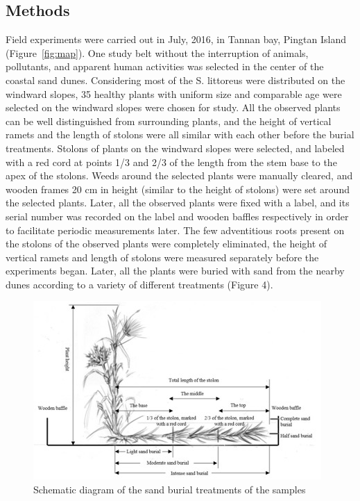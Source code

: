 \documentclass[]{interact}
\theoremstyle{plain}%
\theoremstyle{definition}
\theoremstyle{remark}
\begin{document}
\subsection{Methods}
Field experiments were carried out in July, 2016, in Tannan bay, Pingtan Island (Figure~\ref{fig:map}). One study belt without the interruption of animals, pollutants, and apparent human activities was selected in the center of the coastal sand dunes. Considering most of the S. littoreus were distributed on the windward slopes, 35 healthy plants with uniform size and comparable age were selected on the windward slopes were chosen for study. All the observed plants can be well distinguished from surrounding plants, and the height of vertical ramets and the length of stolons were all similar with each other before the burial treatments. Stolons of plants on the windward slopes were selected, and labeled with a red cord at points 1/3 and 2/3 of the length from the stem base to the apex of the stolons. Weeds around the selected plants were manually cleared, and wooden frames 20 cm in height (similar to the height of stolons) were set around the selected plants. Later, all the observed plants were fixed with a label, and its serial number was recorded on the label and wooden baffles respectively in order to facilitate periodic measurements later. The few adventitious roots present on the stolons of the observed plants were completely eliminated, the height of vertical ramets and length of stolons were measured separately before the experiments began. Later, all the plants were buried with sand from the nearby dunes according to a variety of different treatments (Figure 4). 


\begin{figure}
  \centering
  \includegraphics[scale=0.8]{../figs/treatment.jpg}
  \caption{Schematic diagram of the sand burial treatments of the samples} 
  \label{treatment}
\end{figure}
\end{document}
